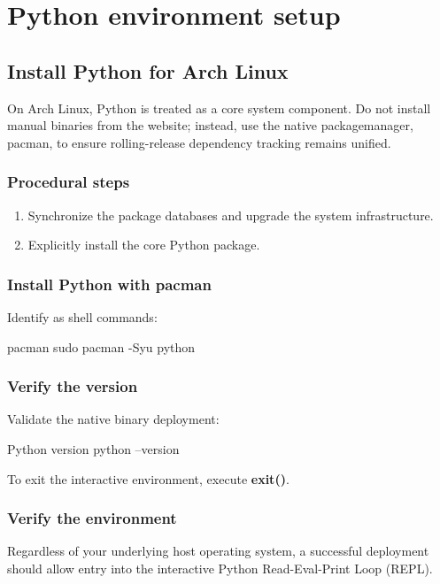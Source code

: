\chapter{Python environment setup}
\label{app:python_setup}

\section{Install Python for Arch Linux}

On Arch Linux, Python is treated as a core system component. Do not install manual binaries from the website; instead, use the native \gls{packagemanager}, \gls{pacman}, to ensure rolling-release dependency tracking remains unified.

\subsection{Procedural steps}
\begin{enumerate}
    \item Synchronize the package databases and upgrade the system infrastructure.
    \item Explicitly install the core Python package.
\end{enumerate}

\subsection{Install Python with pacman}
Identify as shell commands:
\begin{zshbox}{pacman}
sudo pacman -Syu python
\end{zshbox}

\subsection{Verify the version}
Validate the native binary deployment:
\begin{zshbox}{Python version}
python --version
\end{zshbox}

To exit the interactive environment, execute \textbf{exit()}.

\subsection{Verify the environment}

Regardless of your underlying host operating system, a successful deployment should allow entry into the interactive Python Read-Eval-Print Loop (REPL).

